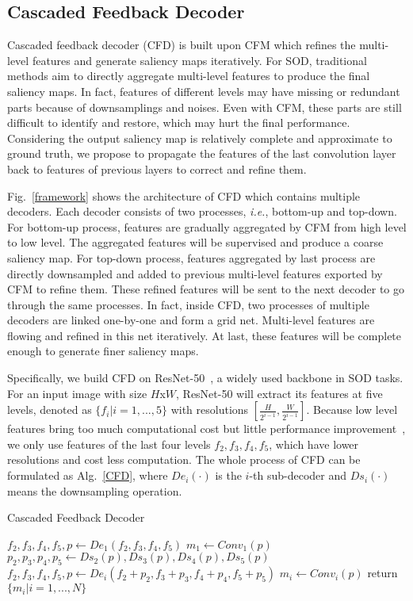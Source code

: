 \documentclass[letterpaper]{article} %
\begin{document}
\subsection{Cascaded Feedback Decoder}
Cascaded feedback decoder (CFD) is built upon CFM which refines the multi-level features and generate saliency maps iteratively. For SOD, traditional methods aim to directly aggregate multi-level features to produce the final saliency maps. In fact, features of different levels may have missing or redundant parts because of downsamplings and noises. Even with CFM, these parts are still difficult to identify and restore, which may hurt the final performance. Considering the output saliency map is relatively complete and approximate to ground truth, we propose to propagate the features of the last convolution layer back to features of previous layers to correct and refine them.

Fig.~\ref{framework} shows the architecture of CFD which contains multiple decoders. Each decoder consists of two processes, {\it i.e.}, bottom-up and top-down. For bottom-up process, features are gradually aggregated by CFM from high level to low level. The aggregated features will be supervised and produce a coarse saliency map. For top-down process, features aggregated by last process are directly downsampled and added to previous multi-level features exported by CFM to refine them. These refined features will be sent to the next decoder to go through the same processes. In fact, inside CFD, two processes of multiple decoders are linked one-by-one and form a grid net. Multi-level features are flowing and refined in this net iteratively. At last, these features will be complete enough to generate finer saliency maps.

Specifically, we build CFD on ResNet-50~\cite{Resnet}, a widely used backbone in SOD tasks. For an input image with size $H$x$W$, ResNet-50 will extract its features at five levels, denoted as $\{f_i | i=1,...,5\}$ with resolutions $[\frac{H}{2^{i-1}}, \frac{W}{2^{i-1}}]$. Because low level features bring too much computational cost but little performance improvement~\cite{CPD}, we only use features of the last four levels $f_2, f_3, f_4, f_5$, which have lower resolutions and cost less computation. The whole process of CFD can be formulated as Alg.~\ref{CFD}, where $De_i(\cdot)$ is the $i$-th sub-decoder and $Ds_i(\cdot)$ means the downsampling operation.

\begin{algorithm}[htb]
  \caption{Cascaded Feedback Decoder}
  \label{CFD}
  \small $f_2, f_3, f_4, f_5, p \leftarrow De_1(f_2, f_3, f_4, f_5)$\;
  \small $m_1 \leftarrow Conv_1(p)$\;
   {
    \small $p_2, p_3, p_4, p_5 \leftarrow Ds_2(p), Ds_3(p), Ds_4(p), Ds_5(p)$\;
    \small $f_2, f_3, f_4, f_5, p \leftarrow De_i(f_2\!+\!p_2, f_3\!+\!p_3, f_4\!+\!p_4, f_5\!+\!p_5)$\;
    \small $m_i \leftarrow Conv_i(p)$\;
  }
  return $\{m_i | i=1,...,N\}$\;
\end{algorithm}
\end{document}
